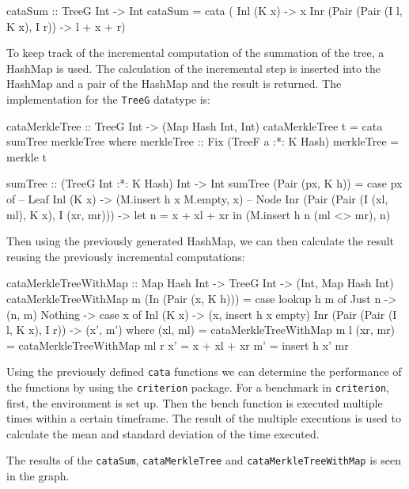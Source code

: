 \begin{haskell}
cataSum :: TreeG Int -> Int
cataSum = cata (\case
  Inl (K x)                         -> x         
  Inr (Pair (Pair (I l, K x), I r)) -> l + x + r)
\end{haskell}

\newpage
To keep track of the incremental computation of the summation of the tree, a HashMap\cite{HaskellDataMap} is used. The calculation of the incremental step is inserted into the HashMap and a pair of the HashMap and the result is returned. The implementation for the \texttt{TreeG} datatype is: 

\begin{haskell}
cataMerkleTree :: TreeG Int -> (Map Hash Int, Int)
cataMerkleTree t = cata sumTree merkleTree
  where
    merkleTree :: Fix (TreeF a :*: K Hash)
    merkleTree = merkle t

    sumTree :: (TreeG Int :*: K Hash) Int -> Int
    sumTree (Pair (px, K h)) = case px of
      -- Leaf  
      Inl (K x)                       
        -> (M.insert h x M.empty, x) 
      -- Node
      Inr (Pair (Pair (I (xl, ml), K x), I (xr, mr))) 
        -> let n = x + xl + xr 
           in (M.insert h n (ml <> mr), n) 
\end{haskell}

Then using the previously generated HashMap, we can then calculate the result reusing the previously incremental computations:

\begin{haskell}
cataMerkleTreeWithMap :: Map Hash Int -> TreeG Int -> (Int, Map Hash Int)
cataMerkleTreeWithMap m (In (Pair (x, K h))) = 
  case lookup h m of
    Just n  -> (n, m)
    Nothing -> case x of
      Inl (K x) -> (x, insert h x empty)
      Inr (Pair (Pair (I l, K x), I r)) -> (x', m')
        where
          (xl, ml) = cataMerkleTreeWithMap m l
          (xr, mr) = cataMerkleTreeWithMap ml r
          x' = x + xl + xr
          m' = insert h x' mr
\end{haskell}

Using the previously defined \texttt{cata} functions we can determine the performance of the functions by using the \texttt{criterion}\cite{HaskellCriterion} package. For a benchmark in \texttt{criterion}, first, the environment is set up. Then the bench function is executed multiple times within a certain timeframe. The result of the multiple executions is used to calculate the mean and standard deviation of the time executed. 

The results of the \texttt{cataSum}, \texttt{cataMerkleTree} and \texttt{cataMerkleTreeWithMap} is seen in the graph. 


